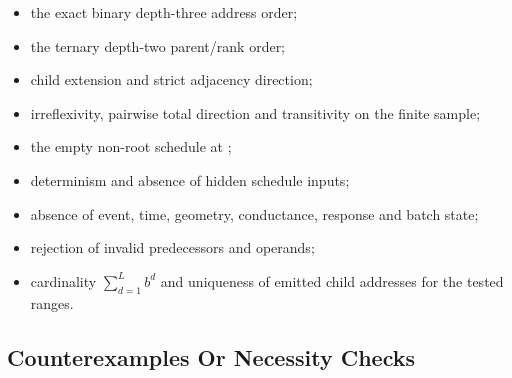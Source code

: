 \begin{itemize}
\tightlist
\item
  the exact binary depth-three address order;
\item
  the ternary depth-two parent/rank order;
\item
  child extension and strict adjacency direction;
\item
  irreflexivity, pairwise total direction and transitivity on the finite
  sample;
\item
  the empty non-root schedule at \texttt{\protect{}};
\item
  determinism and absence of hidden schedule inputs;
\item
  absence of event, time, geometry, conductance, response and batch
  state;
\item
  rejection of invalid predecessors and operands;
\item
  cardinality \(\sum_{d=1}^L b^d\) and uniqueness of emitted child
  addresses for the tested ranges.
\end{itemize}

\subsection{Counterexamples Or Necessity
Checks}\label{counterexamples-or-necessity-checks}

